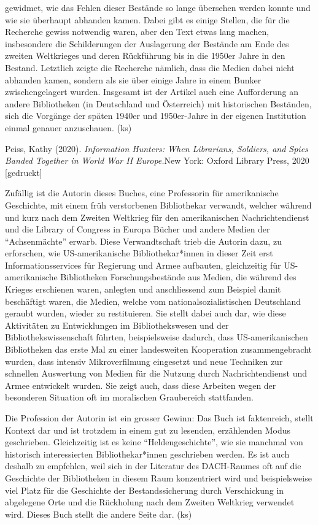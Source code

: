\documentclass[a4paper,
fontsize=11pt,
oneside,
numbers=noperiodatend,
parskip=half-,
bibliography=totoc,
final
]{scrartcl}
\begin{document}
gewidmet, wie das Fehlen dieser Bestände so lange übersehen werden
konnte und wie sie überhaupt abhanden kamen. Dabei gibt es einige
Stellen, die für die Recherche gewiss notwendig waren, aber den Text
etwas lang machen, insbesondere die Schilderungen der Auslagerung der
Bestände am Ende des zweiten Weltkrieges und deren Rückführung bis in
die 1950er Jahre in den Bestand. Letztlich zeigte die Recherche nämlich,
dass die Medien dabei nicht abhanden kamen, sondern als sie über einige
Jahre in einem Bunker zwischengelagert wurden. Insgesamt ist der Artikel
auch eine Aufforderung an andere Bibliotheken (in Deutschland und
Österreich) mit historischen Beständen, sich die Vorgänge der späten
1940er und 1950er-Jahre in der eigenen Institution einmal genauer
anzuschauen. (ks)


Peiss, Kathy (2020). \emph{Information Hunters: When Librarians,
Soldiers, and Spies Banded Together in World War II Europe.}New York:
Oxford Library Press, 2020 {[}gedruckt{]}

Zufällig ist die Autorin dieses Buches, eine Professorin für
amerikanische Geschichte, mit einem früh verstorbenen Bibliothekar
verwandt, welcher während und kurz nach dem Zweiten Weltkrieg für den
amerikanischen Nachrichtendienst und die Library of Congress in Europa
Bücher und andere Medien der \enquote{Achsenmächte} erwarb. Diese
Verwandtschaft trieb die Autorin dazu, zu erforschen, wie
US-amerikanische Bibliothekar*innen in dieser Zeit erst
Informationsservices für Regierung und Armee aufbauten, gleichzeitig für
US-amerikanische Bibliotheken Forschungsbestände aus Medien, die während
des Krieges erschienen waren, anlegten und anschliessend zum Beispiel
damit beschäftigt waren, die Medien, welche vom nationalsozialistischen
Deutschland geraubt wurden, wieder zu restituieren. Sie stellt dabei
auch dar, wie diese Aktivitäten zu Entwicklungen im Bibliothekswesen und
der Bibliothekswissenschaft führten, beispielsweise dadurch, dass
US-amerikanischen Bibliotheken das erste Mal zu einer landesweiten
Kooperation zusammengebracht wurden, dass intensiv Mikroverfilmung
eingesetzt und neue Techniken zur schnellen Auswertung von Medien für
die Nutzung durch Nachrichtendienst und Armee entwickelt wurden. Sie
zeigt auch, dass diese Arbeiten wegen der besonderen Situation oft im
moralischen Graubereich stattfanden.

Die Profession der Autorin ist ein grosser Gewinn: Das Buch ist
faktenreich, stellt Kontext dar und ist trotzdem in einem gut zu
lesenden, erzählenden Modus geschrieben. Gleichzeitig ist es keine
\enquote{Heldengeschichte}, wie sie manchmal von historisch
interessierten Bibliothekar*innen geschrieben werden. Es ist auch
deshalb zu empfehlen, weil sich in der Literatur des DACH-Raumes oft auf
die Geschichte der Bibliotheken in diesem Raum konzentriert wird und
beispielsweise viel Platz für die Geschichte der Bestandssicherung durch
Verschickung in abgelegene Orte und die Rückholung nach dem Zweiten
Weltkrieg verwendet wird. Dieses Buch stellt die andere Seite dar. (ks)
\end{document}
